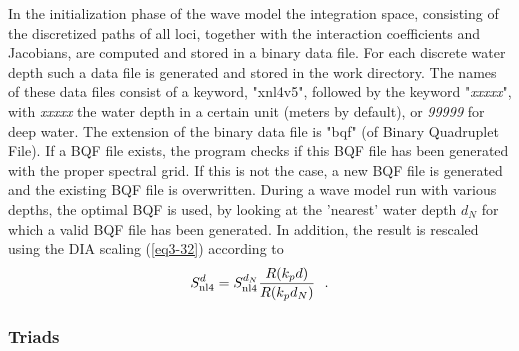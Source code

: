 \documentclass[12pt]{book}
\begin{document}
In the initialization phase of the wave model the
integration space, consisting of the discretized paths of all loci,
together with the interaction coefficients and Jacobians, are
computed and stored in a binary data file. For each discrete water depth such a
data file is generated
and stored in the work directory. The names of these data files
consist of a keyword, "xnl4v5", followed by the keyword "{\it{xxxxx}}", with {\it xxxxx}
the water depth in a certain unit (meters by default), or {\it 99999} for deep water.
The extension of the binary data file is "bqf" (of Binary Quadruplet
File). If a BQF file exists, the program checks if this BQF file has
been generated with the proper spectral grid. If this is not
the case, a new BQF file is generated and the existing BQF file is overwritten.
During a wave model run with various depths, the optimal BQF is
used, by looking at the 'nearest' water depth $d_N$ for which a valid BQF file has been generated.
In addition, the result is rescaled using the DIA scaling (\ref{eq3-32}) according to
\begin{equation}
  S_{\rm nl4}^{d} = S_{\rm nl4}^{d_N} \frac{R(k_pd)}{R(k_pd_N)} \:\:\: .
\end{equation}

\subsubsection{Triads} \label{sec:triad}
\end{document}
